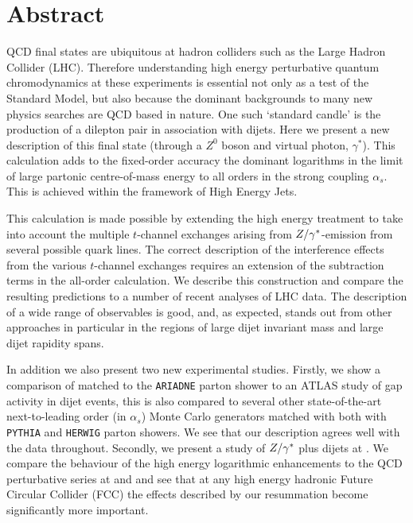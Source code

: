 \chapter*{Abstract}
\noindent
	QCD final states are ubiquitous at hadron colliders such as the Large Hadron Collider (LHC).
	Therefore understanding high energy perturbative quantum chromodynamics at these experiments
	is essential not only as a test of the Standard Model, but also because the dominant
	backgrounds to many new physics searches are QCD based in nature.  One such `standard candle' is the
	production of a dilepton pair in association with dijets.  Here we present a new description
	of this final state (through a $Z^0$ boson and virtual photon, $\gamma^*$).  This calculation adds to the
	fixed-order accuracy the dominant logarithms in the limit of large partonic centre-of-mass
	energy to all orders in the strong coupling $\alpha_s$.  This is achieved within the framework
	of High Energy Jets.

	This calculation is made possible by extending the high energy treatment to take into account
	the multiple $t$-channel exchanges arising from $Z/\gamma^*$-emission from several possible
	quark lines. The correct description of the interference effects from the various $t$-channel
	exchanges requires an extension of the subtraction terms in the all-order calculation.  We
	describe this construction and compare the resulting predictions to a number of recent analyses
	of LHC data. The description of a wide range of observables is good, and, as expected, stands
	out from other approaches in particular in the regions of large dijet invariant mass and large
	dijet rapidity spans.

	In addition we also present two new experimental studies.  Firstly, we show a comparison of \hej
	matched to the \texttt{ARIADNE} parton shower to an ATLAS study of gap activity in dijet events,
	this is also compared to several other state-of-the-art next-to-leading order (in $\alpha_s$)
	Monte Carlo generators matched with both with \texttt{PYTHIA} and \texttt{HERWIG} parton showers.
	We see that our description agrees well with the data throughout.  Secondly, we present
	a study of $Z/\gamma^*$ plus dijets at \htev.  We compare the behaviour of the high energy logarithmic
	enhancements to the QCD perturbative series at \stev and \htev and see that at any high energy
	hadronic Future Circular Collider (FCC) the effects described by our resummation become
	significantly more important.

\vspace{10mm}
\normalsize

